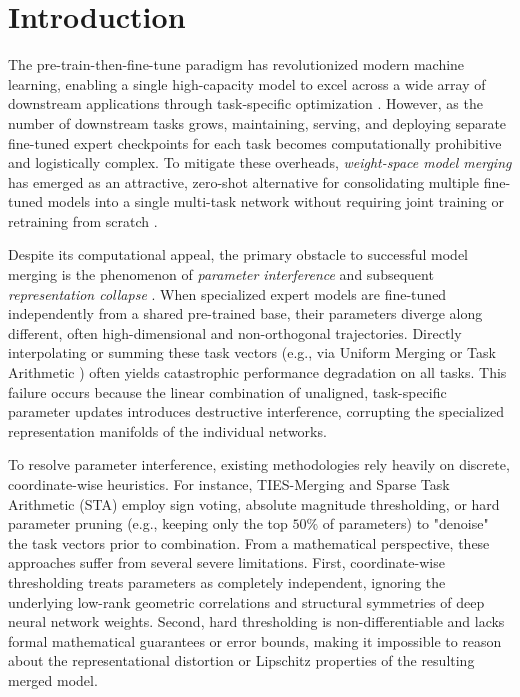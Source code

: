 \section{Introduction}
\label{sec:intro}

The pre-train-then-fine-tune paradigm has revolutionized modern machine learning, enabling a single high-capacity model to excel across a wide array of downstream applications through task-specific optimization \cite{dosovitskiy2020image, devlin2018bert, vaswani2017attention}. However, as the number of downstream tasks grows, maintaining, serving, and deploying separate fine-tuned expert checkpoints for each task becomes computationally prohibitive and logistically complex. To mitigate these overheads, \emph{weight-space model merging} has emerged as an attractive, zero-shot alternative for consolidating multiple fine-tuned models into a single multi-task network without requiring joint training or retraining from scratch \cite{wortsman2022model, jin2022dataless, matena2021merging}.

Despite its computational appeal, the primary obstacle to successful model merging is the phenomenon of \emph{parameter interference} and subsequent \emph{representation collapse} \cite{yadav2023ties}. When specialized expert models are fine-tuned independently from a shared pre-trained base, their parameters diverge along different, often high-dimensional and non-orthogonal trajectories. Directly interpolating or summing these task vectors (e.g., via Uniform Merging or Task Arithmetic \cite{ilharco2022editing}) often yields catastrophic performance degradation on all tasks. This failure occurs because the linear combination of unaligned, task-specific parameter updates introduces destructive interference, corrupting the specialized representation manifolds of the individual networks.

To resolve parameter interference, existing methodologies rely heavily on discrete, coordinate-wise heuristics. For instance, TIES-Merging \cite{yadav2023ties} and Sparse Task Arithmetic (STA) \cite{polymerge} employ sign voting, absolute magnitude thresholding, or hard parameter pruning (e.g., keeping only the top $50\%$ of parameters) to "denoise" the task vectors prior to combination. From a mathematical perspective, these approaches suffer from several severe limitations. First, coordinate-wise thresholding treats parameters as completely independent, ignoring the underlying low-rank geometric correlations and structural symmetries of deep neural network weights. Second, hard thresholding is non-differentiable and lacks formal mathematical guarantees or error bounds, making it impossible to reason about the representational distortion or Lipschitz properties of the resulting merged model. 

